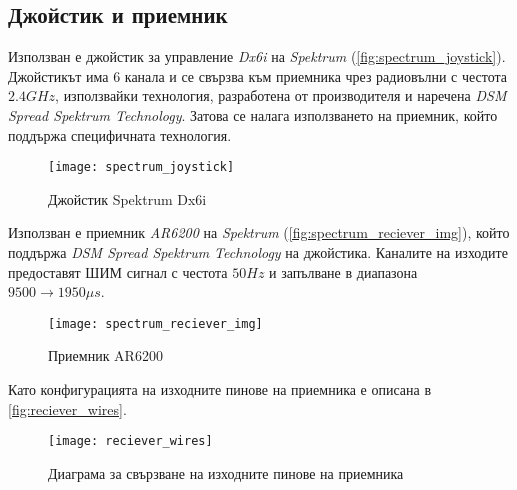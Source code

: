\subsection{Джойстик и приемник}

Използван е джойстик за управление \textit{Dx6i} на \textit{Spektrum} (\autoref{fig:spectrum_joystick}).
Джойстикът има 6 канала
и се свързва към  приемника чрез радиовълни с честота \(2.4GHz\), използвайки
технология, разработена от производителя и наречена \textit{DSM Spread Spektrum Technology}.
Затова се налага използването на приемник, който поддържа специфичната технология.

\begin{figure}[htpb!]
    \centering
    \texttt{[image: spectrum\_joystick]}
    \caption{Джойстик Spektrum Dx6i}
    \label{fig:spectrum_joystick}
\end{figure}

Използван е приемник \textit{AR6200} на \textit{Spektrum} (\autoref{fig:spectrum_reciever_img}), който поддържа \textit{DSM Spread Spektrum Technology} на джойстика.
Каналите на изходите предоставят ШИМ сигнал с честота \(50Hz\) и запълване в диапазона \(9500\to1950 \mu s\).


\begin{figure}[htpb!]
    \centering
    \texttt{[image: spectrum\_reciever\_img]}
    \caption{Приемник AR6200}
    \label{fig:spectrum_reciever_img}
\end{figure}

Като конфигурацията на изходните пинове на приемника е описана в \autoref{fig:reciever_wires}.

\begin{figure}[htpb!]
    \centering
    \texttt{[image: reciever\_wires]}
    \caption{Диаграма за свързване на изходните пинове на приемника}
    \label{fig:reciever_wires}
\end{figure}



\FloatBarrier
